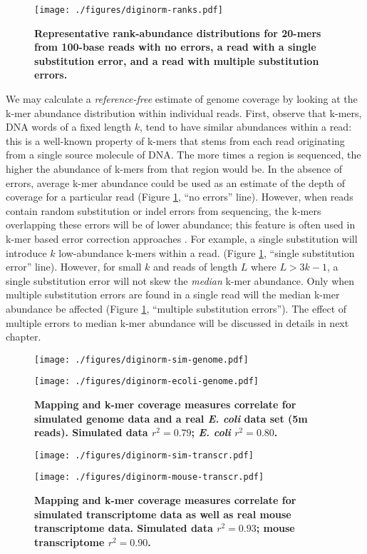 \begin{figure}[!ht]
\centerline{\texttt{[image: ./figures/diginorm-ranks.pdf]}} \caption{ {\bf
Representative rank-abundance distributions for 20-mers from 100-base reads
with no errors, a read with a single substitution error, and a read with
multiple substitution errors.}} \label{fig:rankabund} \end{figure}

We may calculate a {\em reference-free} estimate of genome coverage by looking
at the k-mer abundance distribution within individual reads. First, observe
that k-mers, DNA words of a fixed length $k$, tend to have similar abundances
within a read: this is a well-known property of k-mers that stems from each
read originating from a single source molecule of DNA.  The more times a region
is sequenced, the higher the abundance of k-mers from that region would be.  In
the absence of errors, average k-mer abundance could be used as an estimate of
the depth of coverage for a particular read (Figure \ref{fig:rankabund}, ``no
errors'' line).  However, when reads contain random substitution or indel
errors from sequencing, the k-mers overlapping these errors will be of lower
abundance; this feature is often used in k-mer based error correction
approaches \cite{Kelley2010}.  For example, a single substitution will
introduce $k$ low-abundance k-mers within a read.  (Figure \ref{fig:rankabund},
``single substitution error'' line).  However, for small $k$ and reads of
length $L$ where $L > 3k-1$, a single substitution error will not skew the {\em
median} k-mer abundance.  Only when multiple substitution errors are found in a
single read will the median k-mer abundance be affected (Figure
\ref{fig:rankabund}, ``multiple substitution errors''). The effect of multiple
errors to median k-mer abundance will be discussed in details in next chapter.


\begin{figure}[!ht] \begin{center}
\centerline{\texttt{[image: ./figures/diginorm-sim-genome.pdf]}}
\centerline{\texttt{[image: ./figures/diginorm-ecoli-genome.pdf]}}
\end{center} \caption{ {\bf Mapping and k-mer coverage measures correlate for
simulated genome data and a real {\em E. coli} data set (5m reads).  Simulated
data $r^2 = 0.79$; {\em E. coli} $r^2 = 0.80$.}
}
\label{fig:random} \end{figure}


\begin{figure}[!ht] \begin{center}
\centerline{\texttt{[image: ./figures/diginorm-sim-transcr.pdf]}}
\centerline{\texttt{[image: ./figures/diginorm-mouse-transcr.pdf]}}
\end{center} \caption{ {\bf Mapping and k-mer coverage measures correlate for
simulated transcriptome data as well as real mouse transcriptome data.
Simulated data $r^2 = 0.93$; mouse transcriptome $r^2 = 0.90$.}
}
\label{fig:transcripts} \end{figure}


